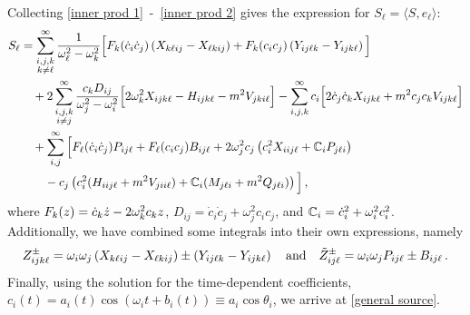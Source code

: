 \documentclass[../PhD.tex]{subfiles}
\begin{document}
\begin{subappendices}
Collecting \eqref{inner prod 1}~\!-~\!\eqref{inner prod 2} gives the expression for $S_\ell = \langle S, e_\ell \rangle$:
\begin{align}
\label{S intermediate}
S_\ell &= \sum_{\substack{i, j, k \\ k \neq \ell}}^\infty \frac{1}{\ol^2 - \ok^2} \Big[ F_k(\dot c_i \dot c_j) \left(X_{k\ell i j} - X_{\ell k i j} \right) + F_k(c_i c_j) \left(Y_{ij\ell k} - Y_{ijk\ell} \right) \Big] \nonumber \\
%
& \quad +2 \sum_{\substack{i,j,k \\ i \neq j}}^\infty \frac{c_k D_{ij}}{\oj^2 - \oi^2} \Big[  2\ok^2 X_{ijk\ell} - H_{ijk\ell} -m^2 V_{jki\ell} \Big] - \sum_{i,j,k}^\infty c_i \Big[ 2 \dot c_j \dot c_k X_{ijk\ell} + m^2 c_j c_k V_{ijk\ell} \Big] \nonumber \\ 
%
& \quad + \sum_{i,j}^\infty \Big[ F_\ell (\dot c_i \dot c_j) P_{ij\ell} + F_\ell (c_i c_j) B_{ij\ell} + 2\oj^2 c_j \left( c_i^2 X_{iij\ell} + \mathbb C_i P_{j\ell i} \right) \nonumber \\
%
& \qquad - c_j \left( c^2_i (H_{iij\ell} + m^2 V_{jii\ell} ) + \mathbb C_i (M_{j\ell i} + m^2 Q_{j\ell i}) \right) \Big] \, ,
\end{align}
where $F_k(z) = \dot c_k \dot z - 2\omega_k^2 c_k z$, $D_{ij} = \dot c_i \dot c_j + \omega^2_j c_i c_j$, and $\mathbb C_i = \dot c_i^2 + \omega_i^2 c_i^2$. Additionally, we have combined some integrals into their own expressions, namely
\begin{align}
Z^{\pm}_{ijk\ell} = \omega_i \omega_j \left( X_{k\ell ij} - X_{\ell kij} \right) \pm \left( Y_{ij\ell k} - Y_{ijk\ell} \right) \quad \text{and} \quad \tilde Z^{\pm}_{ij\ell} = \omega_i \omega_j P_{ij\ell} \pm B_{ij\ell} \, .
\end{align}
Finally, using the solution for the time-dependent coefficients, $c_i(t) = a_i(t) \cos \left( \omega_i t + b_i (t) \right) \equiv a_i \cos \theta_i$, we arrive at \eqref{general source}.



\end{subappendices}
\end{document}
